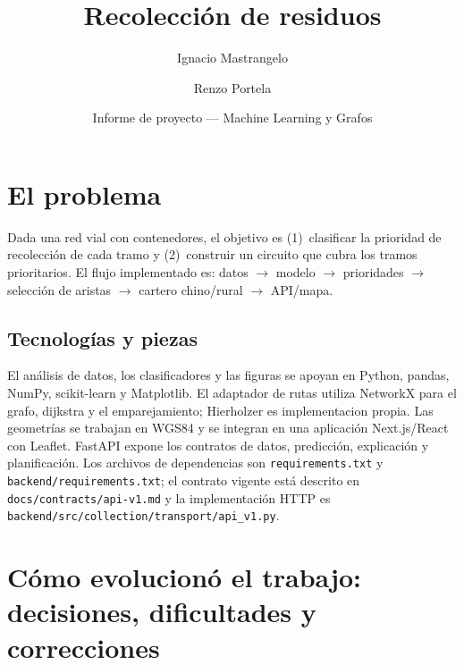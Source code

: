 \documentclass[11pt,a4paper]{article}
\title{Recolección de residuos}
\author{Ignacio Mastrangelo \and Renzo Portela}
\date{Informe de proyecto — Machine Learning y Grafos}
\begin{document}
\maketitle

\tableofcontents
\newpage

\section{El problema}
Dada una red vial con contenedores, el objetivo es (1)~clasificar la prioridad de recolección de cada tramo y (2)~construir un circuito que cubra los tramos prioritarios. El flujo implementado es: datos $\rightarrow$ modelo $\rightarrow$ prioridades $\rightarrow$ selección de aristas $\rightarrow$ cartero chino/rural $\rightarrow$ API/mapa.

\subsection{Tecnologías y piezas}
El análisis de datos, los clasificadores y las figuras se apoyan en Python, pandas, NumPy, scikit-learn y Matplotlib. El adaptador de rutas utiliza NetworkX para el grafo, dijkstra y el emparejamiento; Hierholzer es implementacion propia. Las geometrías se trabajan en WGS84 y se integran en una aplicación Next.js/React con Leaflet. FastAPI expone los contratos de datos, predicción, explicación y planificación. Los archivos de dependencias son \texttt{requirements.txt} y \texttt{backend/requirements.txt}; el contrato vigente está descrito en \texttt{docs/contracts/api-v1.md} y la implementación HTTP es \texttt{backend/src/collection/transport/api\_v1.py}.

\section{Cómo evolucionó el trabajo: decisiones, dificultades y correcciones}
\end{document}
